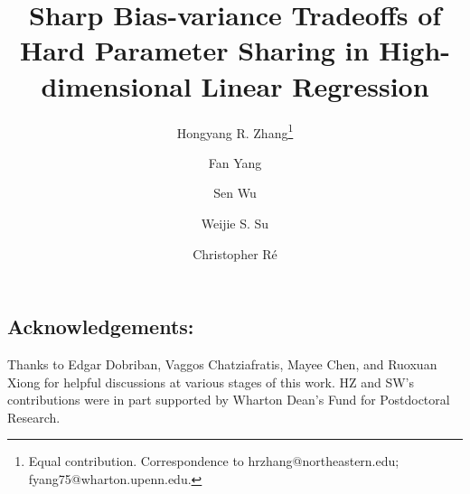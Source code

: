 \documentclass{article}
\newcommand*\samethanks[1][\value{footnote}]{\footnotemark[#1]}
\begin{document}
\title{\textbf{Sharp Bias-variance Tradeoffs of Hard Parameter Sharing in High-dimensional Linear Regression}}
\vspace{0.15in}
\author[1]{Hongyang R. Zhang\thanks{Equal contribution. Correspondence to hrzhang@northeastern.edu; fyang75@wharton.upenn.edu.}}
\author[2]{Fan Yang\samethanks}
\author[3]{Sen Wu}
\author[2]{Weijie S. Su}
\author[3]{Christopher R\'e}
\vspace{0.15in}



\maketitle



%


%
%




\subsection*{Acknowledgements:}
Thanks to Edgar Dobriban, Vaggos Chatziafratis, Mayee Chen, and Ruoxuan Xiong for helpful discussions at various stages of this work.
HZ and SW's contributions were in part supported by Wharton Dean's Fund for Postdoctoral Research.



\appendix







\end{document}

